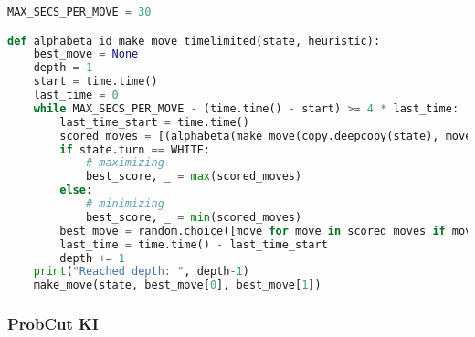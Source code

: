 \begin{lstlisting}[language=Python]
MAX_SECS_PER_MOVE = 30

def alphabeta_id_make_move_timelimited(state, heuristic):
    best_move = None
    depth = 1
    start = time.time()
    last_time = 0
    while MAX_SECS_PER_MOVE - (time.time() - start) >= 4 * last_time:
        last_time_start = time.time()
        scored_moves = [(alphabeta(make_move(copy.deepcopy(state), move[0], move[1]), depth-1, -math.inf, math.inf, heuristic), move) for move in state.possible_moves]
        if state.turn == WHITE:
            # maximizing
            best_score, _ = max(scored_moves)
        else:
            # minimizing
            best_score, _ = min(scored_moves)
        best_move = random.choice([move for move in scored_moves if move[0] == best_score])[1]
        last_time = time.time() - last_time_start
        depth += 1
    print("Reached depth: ", depth-1)
    make_move(state, best_move[0], best_move[1])
\end{lstlisting}

\hypertarget{probcut-ki}{%
\subsubsection{ProbCut KI}\label{probcut-ki}}

